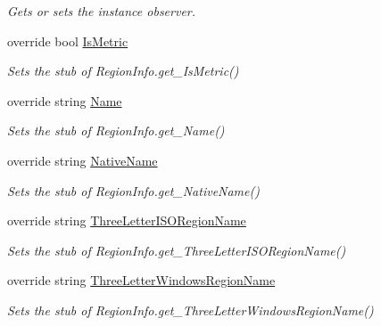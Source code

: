 \begin{DoxyCompactItemize}
\begin{DoxyCompactList}\small\item\em Gets or sets the instance observer.\end{DoxyCompactList}\item 
override bool \hyperlink{class_system_1_1_globalization_1_1_fakes_1_1_stub_region_info_a1393e8bfdd98e11061e58dfd6edfd36c}{Is\-Metric}
\begin{DoxyCompactList}\small\item\em Sets the stub of Region\-Info.\-get\-\_\-\-Is\-Metric()\end{DoxyCompactList}\item 
override string \hyperlink{class_system_1_1_globalization_1_1_fakes_1_1_stub_region_info_a3afb7dcba01f7bc51b0bb3f9a71f5570}{Name}
\begin{DoxyCompactList}\small\item\em Sets the stub of Region\-Info.\-get\-\_\-\-Name()\end{DoxyCompactList}\item 
override string \hyperlink{class_system_1_1_globalization_1_1_fakes_1_1_stub_region_info_af0a1b170fde06f535aa6b56c27dfea01}{Native\-Name}
\begin{DoxyCompactList}\small\item\em Sets the stub of Region\-Info.\-get\-\_\-\-Native\-Name()\end{DoxyCompactList}\item 
override string \hyperlink{class_system_1_1_globalization_1_1_fakes_1_1_stub_region_info_adcaf9c434a2070686105b7ebb1a1d286}{Three\-Letter\-I\-S\-O\-Region\-Name}
\begin{DoxyCompactList}\small\item\em Sets the stub of Region\-Info.\-get\-\_\-\-Three\-Letter\-I\-S\-O\-Region\-Name()\end{DoxyCompactList}\item 
override string \hyperlink{class_system_1_1_globalization_1_1_fakes_1_1_stub_region_info_a3f58f1291c2bea786cf6b516bcc5ee25}{Three\-Letter\-Windows\-Region\-Name}
\begin{DoxyCompactList}\small\item\em Sets the stub of Region\-Info.\-get\-\_\-\-Three\-Letter\-Windows\-Region\-Name()\end{DoxyCompactList}\item 

\end{DoxyCompactItemize}
